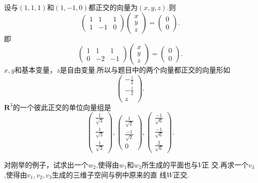 ﻿\documentclass{book} \usepackage{exsheets} \usepackage{xeCJK}
\begin{document}
\begin{solution}
  设与$(1,1,1)$和$(1,-1,0)$都正交的向量为$(x,y,z)$.则
$$
\begin{pmatrix}
  1&1&1\\
  1&-1&0
\end{pmatrix}
\begin{pmatrix}
  x\\
  y\\
  z
\end{pmatrix}=
\begin{pmatrix}
  0\\
  0
\end{pmatrix}.
$$
即
$$
\begin{pmatrix}
  1&1&1\\
  0&-2&-1
\end{pmatrix}
\begin{pmatrix}
  x\\
  y\\
  z
\end{pmatrix}=
\begin{pmatrix}
  0\\
  0
\end{pmatrix}.
$$
$x,y$和基本变量，$z$是自由变量.所以与题目中的两个向量都正交的向量形如
$$
\begin{pmatrix}
  -\frac{z}{2}\\
  -\frac{z}{2}\\
  z
\end{pmatrix}.
$$
$\mathbf{R}^3$的一个彼此正交的单位向量组是
$$
\begin{pmatrix}
  \frac{1}{\sqrt{3}}\\
  \frac{1}{\sqrt{3}}\\
  \frac{1}{\sqrt{3}}
\end{pmatrix},
\begin{pmatrix}
  \frac{1}{\sqrt{2}}\\
  \frac{-1}{\sqrt{2}}\\
  0
\end{pmatrix},
\begin{pmatrix}
  \frac{-1}{\sqrt{6}}\\
  \frac{-1}{\sqrt{6}}\\
  \frac{2}{\sqrt{6}}
\end{pmatrix}.
$$
\end{solution}
\begin{question}
  对刚举的例子，试求出一个$w_2$,使得由$w_1$和$w_2$所生成的平面也与$V$正
  交.再求一个$v_3$,使得由$v_1,v_2,v_3$生成的三维子空间与例中原来的直
  线$W$正交.
\end{question}
\end{document}
